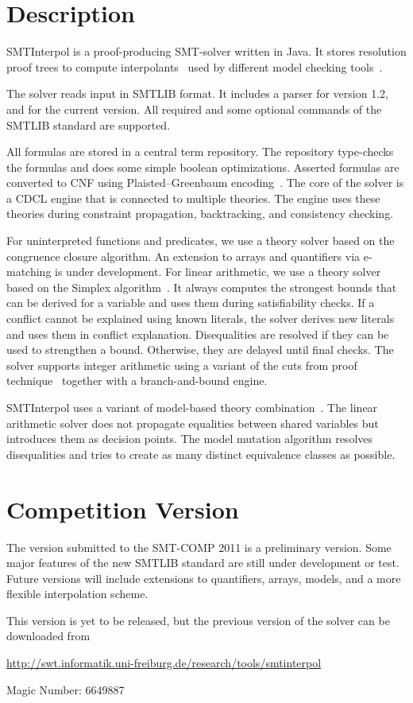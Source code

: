\documentclass{article}
\title{\SI\\{\large Version \version}}
\author{J\"urgen Christ, Jochen Hoenicke\\
  University of Freiburg\\
  \texttt{\{christj,hoenicke\}@informatik.uni-freiburg.de}}
\date{July 8, 2011}
\newcommand\SI{SMTInterpol\xspace}
\begin{document}
\maketitle
\section*{Description}
\SI is a proof-producing SMT-solver written in Java.  It stores resolution proof trees to
compute interpolants~\cite{mcmillan05itp} used by different model checking
tools~\cite{HHP09,HHP10}.

The solver reads input in SMTLIB format.  It includes a parser for version
1.2, and for the current version.  All required and some optional commands of
the SMTLIB standard are supported.

All formulas are stored in a central term repository.  The repository
type-checks the formulas and does some simple boolean optimizations.  Asserted
formulas are converted to CNF using Plaisted--Greenbaum
encoding~\cite{DBLP:journals/jsc/PlaistedG86}.  The core of the solver is a
CDCL engine that is connected to multiple theories.  The engine uses these
theories during constraint propagation, backtracking, and consistency
checking.

For uninterpreted functions and predicates, we use a theory solver based on
the congruence closure algorithm.  An extension to arrays and quantifiers via
e-matching is under development.  For linear arithmetic, we use a theory
solver based on the Simplex algorithm~\cite{DBLP:conf/cav/DutertreM06}.  It
always computes the strongest bounds that can be derived for a variable and
uses them during satisfiability checks.  If a conflict cannot be explained
using known literals, the solver derives new literals and uses them in
conflict explanation.  Disequalities are resolved if they can be used to
strengthen a bound.  Otherwise, they are delayed until final checks.  The
solver supports integer arithmetic using a variant of the cuts from proof
technique~\cite{DBLP:conf/cav/DilligDA09} together with a branch-and-bound
engine.

\SI uses a variant of model-based theory
combination~\cite{DBLP:journals/entcs/MouraB08}.  The linear arithmetic solver
does not propagate equalities between shared variables but introduces them as
decision points.  The model mutation algorithm resolves disequalities
and tries to create as many distinct equivalence classes as possible.

\section*{Competition Version}
The version submitted to the SMT-COMP 2011 is a preliminary version.  Some
major features of the new SMTLIB standard are still under development or
test.  Future versions will include extensions to quantifiers, arrays, models,
and a more flexible interpolation scheme.

This version is yet to be released, but the previous version of the solver can
be downloaded from
\begin{center}
  \url{http://swt.informatik.uni-freiburg.de/research/tools/smtinterpol}
\end{center}

Magic Number: 6649887



\end{document}
